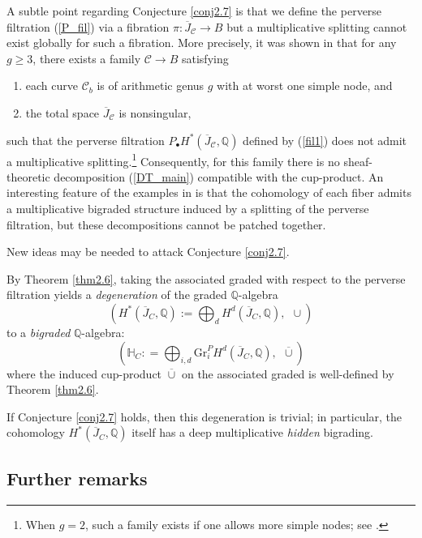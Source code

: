 \documentclass{pspum-l}
\theoremstyle{plain}
\theoremstyle{definition}
\theoremstyle{remark}
\newcommand{\BH}{{\mathbb{H}}}
\newcommand{\BQ}{{\mathbb{Q}}}
\newcommand{\CC}{{\mathcal C}}
\begin{document}
A subtle point regarding Conjecture \ref{conj2.7} is that we define the perverse filtration (\ref{P_fil}) via a fibration $\pi: \overline{J}_\CC \to B$ but a multiplicative splitting cannot exist globally for such a fibration. More precisely, it was shown in \cite{BMSY1} that for any $g\geq 3$, there exists a family $\CC \to B$ satisfying
\begin{enumerate}
    \item[(a)] each curve $\CC_b$ is of arithmetic genus $g$ with at worst one simple node, and 
    \item[(b)] the total space $\overline{J}_\CC$ is nonsingular,
\end{enumerate}
such that the perverse filtration $P_\bullet H^*(\overline{J}_\CC, \BQ)$ defined by (\ref{fil1}) does not admit a multiplicative splitting.\footnote{When $g=2$, such a family exists if one allows more simple nodes; see \cite[Proof of Theorem 0.4]{BMSY1}.} Consequently, for this family there is no sheaf-theoretic decomposition (\ref{DT_main}) compatible with the cup-product. An interesting feature of the examples in \cite[Theorem 0.4]{BMSY1} is that the cohomology of each fiber admits a multiplicative bigraded structure induced by a splitting of the perverse filtration, but these decompositions cannot be patched together.



New ideas may be needed to attack Conjecture \ref{conj2.7}.

By Theorem \ref{thm2.6}, taking the associated graded with respect to the perverse filtration yields a \emph{degeneration} of the graded $\BQ$-algebra
\[
\left(H^*(\overline{J}_C, \BQ):= \bigoplus_{d} H^d(\overline{J}_C, \BQ), ~~  \cup \right)
\]
to a \emph{bigraded} $\BQ$-algebra:
\[
\left(\BH_{C}: = \bigoplus_{i,d} \mathrm{Gr}^P_i H^d(\overline{J}_C, \BQ), ~~ \overline{\cup} \right)
\]
where the induced cup-product $\overline{\cup}$ on the associated graded is well-defined by Theorem \ref{thm2.6}. 

If Conjecture \ref{conj2.7} holds, then this degeneration is trivial; in particular, the cohomology $H^*(\overline{J}_C, \BQ)$ itself has a deep multiplicative \emph{hidden} bigrading.









\subsection{Further remarks}
\end{document}
